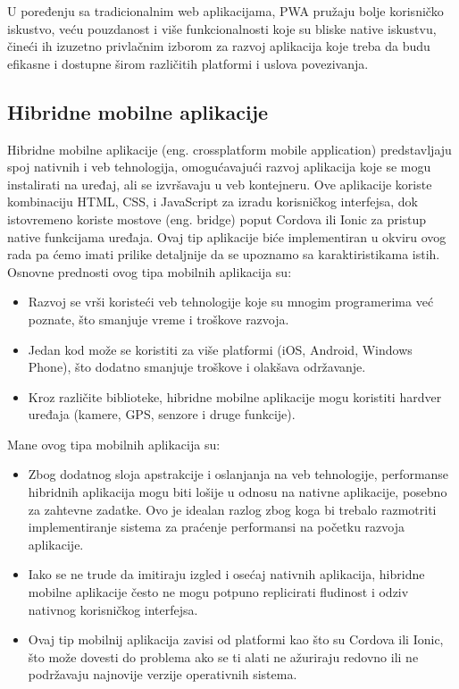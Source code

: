 \documentclass[12pt,oneside]{memoir}
\begin{document}
U poređenju sa tradicionalnim web aplikacijama, PWA pružaju bolje korisničko iskustvo, veću pouzdanost i više funkcionalnosti koje su bliske native iskustvu, čineći ih izuzetno privlačnim izborom za razvoj aplikacija koje treba da budu efikasne i dostupne širom različitih platformi i uslova povezivanja.

\subsection{Hibridne mobilne aplikacije}

Hibridne mobilne aplikacije (eng. crossplatform mobile application) predstavljaju spoj nativnih i veb tehnologija, omogućavajući razvoj aplikacija koje se mogu instalirati na uređaj, ali se izvršavaju u veb kontejneru. Ove aplikacije koriste kombinaciju HTML, CSS, i JavaScript za izradu korisničkog interfejsa, dok istovremeno koriste mostove (eng. bridge) poput Cordova ili Ionic za pristup native funkcijama uređaja. Ovaj tip aplikacije biće implementiran u okviru ovog rada pa ćemo imati prilike detaljnije da se upoznamo sa karaktiristikama istih. Osnovne prednosti ovog tipa mobilnih aplikacija su:

\begin{itemize}
    \item Razvoj se vrši koristeći veb tehnologije koje su mnogim programerima već poznate, što smanjuje vreme i troškove razvoja.
    \item Jedan kod može se koristiti za više platformi (iOS, Android, Windows Phone), što dodatno smanjuje troškove i olakšava održavanje.
    \item Kroz različite biblioteke, hibridne mobilne aplikacije mogu koristiti hardver uređaja (kamere, GPS, senzore i druge funkcije).
\end{itemize}
Mane ovog tipa mobilnih aplikacija su:
\begin{itemize}
    \item Zbog dodatnog sloja apstrakcije i oslanjanja na veb tehnologije, performanse hibridnih aplikacija mogu biti lošije u odnosu na nativne aplikacije, posebno za zahtevne zadatke. Ovo je idealan razlog zbog koga bi trebalo razmotriti implementiranje sistema za praćenje performansi na početku razvoja aplikacije.
    \item Iako se ne trude da imitiraju izgled i osećaj nativnih aplikacija, hibridne mobilne aplikacije često ne mogu potpuno replicirati fludinost i odziv nativnog korisničkog interfejsa.
    \item Ovaj tip mobilnij aplikacija zavisi od platformi kao što su Cordova ili Ionic, što može dovesti do problema ako se ti alati ne ažuriraju redovno ili ne podržavaju najnovije verzije operativnih sistema.
\end{itemize}
\end{document}
